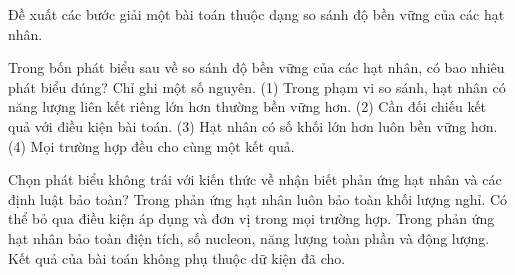 \begin{bt}
Đề xuất các bước giải một bài toán thuộc dạng so sánh độ bền vững của các hạt nhân.
\end{bt}

\begin{ex}
Trong bốn phát biểu sau về so sánh độ bền vững của các hạt nhân, có bao nhiêu phát biểu đúng? Chỉ ghi một số nguyên. (1) Trong phạm vi so sánh, hạt nhân có năng lượng liên kết riêng lớn hơn thường bền vững hơn. (2) Cần đối chiếu kết quả với điều kiện bài toán. (3) Hạt nhân có số khối lớn hơn luôn bền vững hơn. (4) Mọi trường hợp đều cho cùng một kết quả.
\end{ex}

\begin{ex}
Chọn phát biểu không trái với kiến thức về nhận biết phản ứng hạt nhân và các định luật bảo toàn?
\choice
{Trong phản ứng hạt nhân luôn bảo toàn khối lượng nghỉ.}
{Có thể bỏ qua điều kiện áp dụng và đơn vị trong mọi trường hợp.}
{\True Trong phản ứng hạt nhân bảo toàn điện tích, số nucleon, năng lượng toàn phần và động lượng.}
{Kết quả của bài toán không phụ thuộc dữ kiện đã cho.}
\end{ex}

